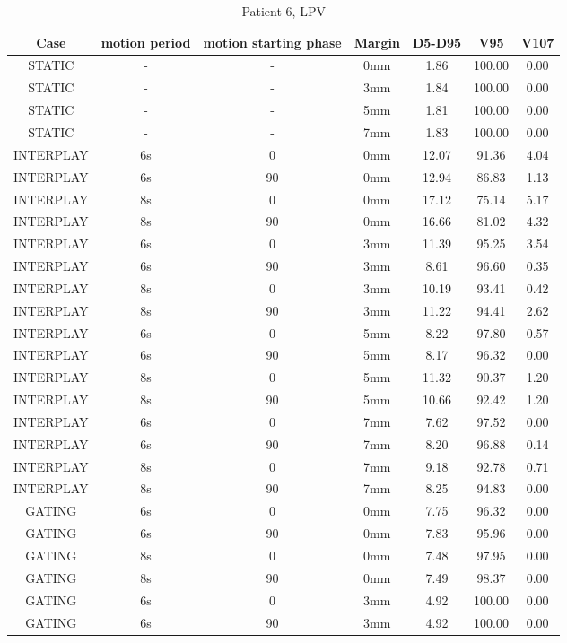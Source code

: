 \begin{table}[H]
  \centering
  \caption{Patient 6, LPV}
  \begin{tabular}{|c||c|c|c||c|c|c|}
    \hline\hline
    Case & motion period & motion starting phase & Margin & D5-D95 & V95 & V107\\
    \hline 
STATIC & - & - & 0mm & 1.86 & 100.00 & 0.00 \\
STATIC & - & - & 3mm & 1.84 & 100.00 & 0.00 \\
STATIC & - & - & 5mm & 1.81 & 100.00 & 0.00 \\
STATIC & - & - & 7mm & 1.83 & 100.00 & 0.00 \\
INTERPLAY & 6s & 0 & 0mm & 12.07 & 91.36 & 4.04 \\
INTERPLAY & 6s & 90 & 0mm & 12.94 & 86.83 & 1.13 \\
INTERPLAY & 8s & 0 & 0mm & 17.12 & 75.14 & 5.17 \\
INTERPLAY & 8s & 90 & 0mm & 16.66 & 81.02 & 4.32 \\
INTERPLAY & 6s & 0 & 3mm & 11.39 & 95.25 & 3.54 \\
INTERPLAY & 6s & 90 & 3mm & 8.61 & 96.60 & 0.35 \\
INTERPLAY & 8s & 0 & 3mm & 10.19 & 93.41 & 0.42 \\
INTERPLAY & 8s & 90 & 3mm & 11.22 & 94.41 & 2.62 \\
INTERPLAY & 6s & 0 & 5mm & 8.22 & 97.80 & 0.57 \\
INTERPLAY & 6s & 90 & 5mm & 8.17 & 96.32 & 0.00 \\
INTERPLAY & 8s & 0 & 5mm & 11.32 & 90.37 & 1.20 \\
INTERPLAY & 8s & 90 & 5mm & 10.66 & 92.42 & 1.20 \\
INTERPLAY & 6s & 0 & 7mm & 7.62 & 97.52 & 0.00 \\
INTERPLAY & 6s & 90 & 7mm & 8.20 & 96.88 & 0.14 \\
INTERPLAY & 8s & 0 & 7mm & 9.18 & 92.78 & 0.71 \\
INTERPLAY & 8s & 90 & 7mm & 8.25 & 94.83 & 0.00 \\
GATING & 6s & 0 & 0mm & 7.75 & 96.32 & 0.00 \\
GATING & 6s & 90 & 0mm & 7.83 & 95.96 & 0.00 \\
GATING & 8s & 0 & 0mm & 7.48 & 97.95 & 0.00 \\
GATING & 8s & 90 & 0mm & 7.49 & 98.37 & 0.00 \\
GATING & 6s & 0 & 3mm & 4.92 & 100.00 & 0.00 \\
GATING & 6s & 90 & 3mm & 4.92 & 100.00 & 0.00 \\

\end{tabular}
\end{table}
